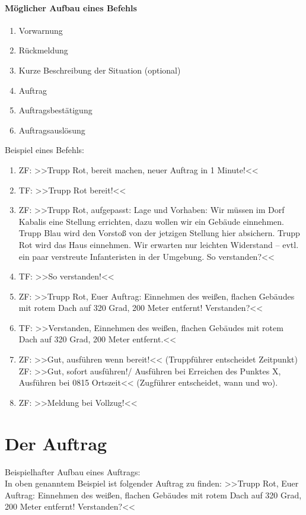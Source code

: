 \paragraph*{Möglicher Aufbau eines Befehls}
\begin{enumerate}
	\item Vorwarnung
	\item Rückmeldung
	\item Kurze Beschreibung der Situation (optional)
	\item Auftrag
	\item Auftragsbestätigung
	\item Auftragsauslösung
\end{enumerate}

Beispiel eines Befehls:
\begin{enumerate}
	\item ZF: >>Trupp Rot, bereit machen, neuer Auftrag in 1 Minute!<<
	\item TF: >>Trupp Rot bereit!<<
	\item ZF: >>Trupp Rot, aufgepasst: Lage und Vorhaben: Wir müssen im Dorf Kabalis eine Stellung errichten, dazu wollen wir ein Gebäude einnehmen. Trupp Blau wird den Vorstoß von der jetzigen Stellung hier absichern. Trupp Rot wird das Haus einnehmen. Wir erwarten nur leichten Widerstand -- evtl. ein paar verstreute Infanteristen in der Umgebung. So verstanden?<<
	\item TF: >>So verstanden!<<
	\item ZF: >>Trupp Rot, Euer Auftrag: Einnehmen des weißen, flachen Gebäudes mit rotem Dach auf 320 Grad, 200 Meter entfernt! Verstanden?<<
	\item TF: >>Verstanden, Einnehmen des weißen, flachen Gebäudes mit rotem Dach auf 320 Grad, 200 Meter entfernt.<<
	\item ZF: >>Gut, ausführen wenn bereit!<< (Truppführer entscheidet Zeitpunkt)\\ 
	ZF: >>Gut, sofort ausführen!/ Ausführen bei Erreichen des Punktes X, Ausführen bei 0815 Ortszeit<< (Zugführer entscheidet, wann und wo).
	\item ZF: >>Meldung bei Vollzug!<<
\end{enumerate}

\section{Der Auftrag}
\label{subsec:auftrag}
Beispielhafter Aufbau eines Auftrags:\\
In oben genanntem Beispiel ist folgender Auftrag zu finden:
>>Trupp Rot, Euer Auftrag: Einnehmen des weißen, flachen Gebäudes mit rotem Dach auf 320 Grad, 200 Meter entfernt! Verstanden?<<

